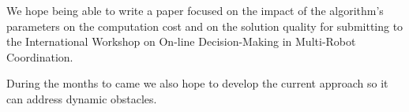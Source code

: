 We hope being able to write a paper focused on the impact of the algorithm's parameters on the computation cost and on the solution quality  for submitting to the International Workshop on On-line Decision-Making in Multi-Robot Coordination.

During the months to came we also hope to develop the current approach so it can address dynamic obstacles.



% 
{}




